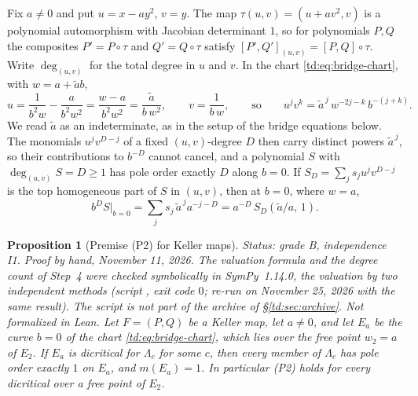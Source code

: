 \documentclass[a4paper,11pt]{article}
\newcommand{\filename}[1]{\texttt{\seqsplit{#1}}}
\theoremstyle{jsplain}
\newtheorem{proposition}[theorem]{Proposition}
\theoremstyle{jsdef}
\theoremstyle{jsrem}
\begin{document}
Fix $a \neq 0$ and put $u = x - a y^2$, $v = y$. The map $\tau(u,v) = (u + a v^2, v)$ is a
polynomial automorphism with Jacobian determinant $1$, so for polynomials $P, Q$ the composites
$P' = P \circ \tau$ and $Q' = Q \circ \tau$ satisfy $[P', Q']_{(u,v)} = [P,Q] \circ \tau$. Write
$\deg_{(u,v)}$ for the total degree in $u$ and $v$. In the chart \eqref{td:eq:bridge-chart}, with
$w = a + \tilde a b$,
\[
u = \frac{1}{b^2 w} - \frac{a}{b^2 w^2} = \frac{w - a}{b^2 w^2} = \frac{\tilde a}{b\, w^2},
\qquad v = \frac{1}{b\, w},
\qquad\text{so}\qquad
u^j v^k = \tilde a^{\,j}\, w^{-2j-k}\, b^{-(j+k)} .
\]
We read $\tilde a$ as an indeterminate, as in the setup of the bridge equations below. The
monomials $u^j v^{D-j}$ of a fixed $(u,v)$-degree $D$ then carry distinct powers $\tilde a^{\,j}$,
so their contributions to $b^{-D}$ cannot cancel, and a polynomial $S$ with
$\deg_{(u,v)} S = D \geq 1$ has pole order exactly $D$ along $b = 0$. If
$S_D = \sum_j s_j u^j v^{D-j}$ is the top homogeneous part of $S$ in $(u,v)$, then at $b = 0$,
where $w = a$,
\begin{equation}\label{td:eq:P2-restriction}
b^D S\big|_{b=0} = \sum_j s_j\, \tilde a^{\,j} a^{-j-D} = a^{-D}\, S_D(\tilde a/a,\, 1).
\end{equation}

\begin{proposition}[Premise (P2) for Keller maps]\label{td:prop:P2}
\textit{Status: grade B, independence I1. Proof by hand, November 11, 2026. The valuation formula
and the degree count of Step~4 were checked symbolically in SymPy~1.14.0, the valuation by two
independent methods (script \filename{phase1\_p2\_check.py}, exit code $0$; re-run on November 25,
2026 with the same result). The script is not part of the archive of \S\ref{td:sec:archive}.
Not formalized in Lean.}
Let $F = (P,Q)$ be a Keller map, let $a \neq 0$, and let $E_a$ be the curve $b = 0$ of the chart
\eqref{td:eq:bridge-chart}, which lies over the free point $w_2 = a$ of $E_2$. If $E_a$ is
dicritical for $\Lambda_c$ for some $c$, then every member of $\Lambda_c$ has pole order exactly
$1$ on $E_a$, and $m(E_a) = 1$. In particular (P2) holds for every dicritical over a free point
of $E_2$.
\end{proposition}
\end{document}
